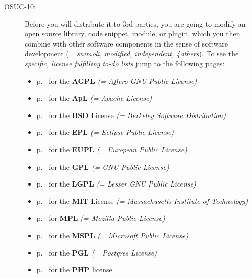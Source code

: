 \begin{description}
\item[OSUC-10:]\label{OSUC-10-DEF} Before you will distribute it to 3rd parties,
you are going to modify an open source library, code snippet, module, or plugin,
which you then combine with other software components in the sense of software
development (= \textit{snimoli, modified, independent, 4others}). To see the
\textit{specific, license fulfilling to-do lists} jump to the following pages:
  \begin{itemize}
    \item p.\ \pageref{OSUC-10-AGPL} for the \textbf{AGPL}
      \textit{(= Affero GNU Public License)} 
    \item p.\ \pageref{OSUC-10-Apache20} for the \textbf{ApL}
      \textit{(= Apache License)}
    \item p.\ \pageref{OSUC-10-BSD} for the \textbf{BSD} License
      \textit{(= Berkeley Software Distribution)}
    \item p.\ \pageref{OSUC-10-EPL} for the \textbf{EPL}
      \textit{(= Eclipse Public License)}     
    \item p.\ \pageref{OSUC-10-EUPL} for the \textbf{EUPL}
      \textit{(= European Public License)} 
    \item p.\ \pageref{OSUC-10-GPL} for the \textbf{GPL}
       \textit{(= GNU Public License)} 
    \item p.\ \pageref{OSUC-10-LGPL} for the \textbf{LGPL}
      \textit{(= Lesser GNU Public License)}           
    \item p.\ \pageref{OSUC-10-MIT} for the \textbf{MIT} License
       \textit{(= Massachusetts Institute of Technology)} 
    \item p.\ \pageref{OSUC-10-MPL} for \textbf{MPL}
      \textit{(= Mozilla Public License)}     
    \item p.\ \pageref{OSUC-10-MsPL} for the \textbf{MSPL}
      \textit{(= Microsoft Public License)} 
    \item p.\ \pageref{OSUC-10-PGL} for the \textbf{PGL}
      \textit{(= Postgres License)} 
    \item p.\ \pageref{OSUC-10-PHP} for the \textbf{PHP} license 
  \end{itemize}

\end{description}

%
